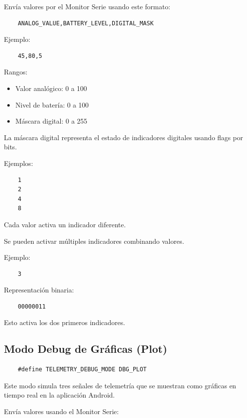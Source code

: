 Envía valores por el Monitor Serie usando este formato:

\begin{verbatim}
    ANALOG_VALUE,BATTERY_LEVEL,DIGITAL_MASK
\end{verbatim}

Ejemplo:

\begin{verbatim}
    45,80,5
\end{verbatim}

Rangos:

\begin{itemize}
    \item Valor analógico: 0 a 100
    \item Nivel de batería: 0 a 100
    \item Máscara digital: 0 a 255
\end{itemize}

La máscara digital representa el estado de indicadores digitales usando flags por bits.

Ejemplos:

\begin{verbatim}
    1
    2
    4
    8
\end{verbatim}

Cada valor activa un indicador diferente.

Se pueden activar múltiples indicadores combinando valores.

Ejemplo:

\begin{verbatim}
    3
\end{verbatim}

Representación binaria:

\begin{verbatim}
    00000011
\end{verbatim}

Esto activa los dos primeros indicadores.

\subsection{Modo Debug de Gráficas (Plot)}

\begin{verbatim}
    #define TELEMETRY_DEBUG_MODE DBG_PLOT
\end{verbatim}

Este modo simula tres señales de telemetría que se muestran como gráficas en tiempo real en la aplicación Android.

Envía valores usando el Monitor Serie:

